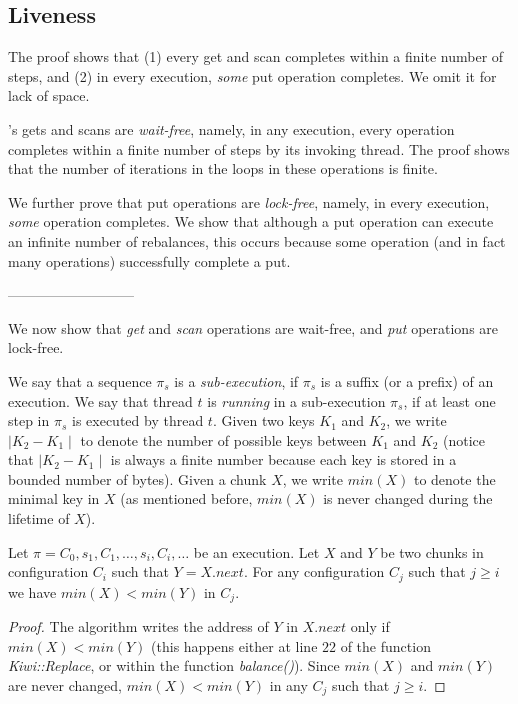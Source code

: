 \subsection{Liveness}
\label{sec:live}


The proof shows that (1) every get and scan completes within a finite number of steps, and (2) in every execution, \emph{some} put operation completes. We omit it for lack of space.

 {\kiwi}'s gets and scans are \emph{wait-free}, namely, in any execution, every operation completes within a finite number of steps by its invoking thread. The proof shows that the number of iterations in the loops in these operations is finite. 

We further prove that put operations are \emph{lock-free}, namely, in every execution, \emph{some} operation completes. We show that although a put operation can execute an infinite number of rebalances, this occurs because 
some operation (and in fact many operations) successfully complete a put.

---------------------------
\newcommand{\abs}[1]{\mid{#1}\mid}

We now show that \emph{get} and \emph{scan} operations are wait-free, and \emph{put} operations are lock-free.

We say that a sequence $\pi_s$ is a \emph{sub-execution}, if $\pi_s$ is a suffix (or a prefix) of an execution.
We say that thread $t$ is \emph{running} in a sub-execution $\pi_s$, if at least one step in $\pi_s$ is executed by thread $t$.
%
Given two keys $K_1$ and $K_2$, we write $\abs{K_2 - K_1}$ to denote the number of possible keys between $K_1$ and $K_2$ (notice that $\abs{K_2 - K_1}$ is always a finite number because each key is stored in a bounded number of bytes).
%
Given a chunk $X$, we write $min(X)$ to denote the minimal key in $X$ (as mentioned before, $min(X)$ is never changed during the lifetime of $X$).



\begin{lemma}
\label{proof:orderLemma}
Let $\pi = C_0,s_1,C_1, \ldots,s_i,C_i,\ldots$ be an execution.
Let $X$ and $Y$ be two chunks in configuration $C_i$ such that $Y=X.next$.
For any configuration $C_j$ such that $j \geq i$ we have  $min(X) < min(Y)$ in $C_j$.
\end{lemma}
\begin{proof}
The algorithm writes the address of $Y$ in $X.next$ only if $min(X) < min(Y)$
(this happens either at line $22$ of the function \emph{Kiwi::Replace}, or within the function \emph{balance()}).
Since $min(X)$ and $min(Y)$ are never changed, $min(X) < min(Y)$ in  any $C_j$ such that $j \geq i$.

\end{proof}

